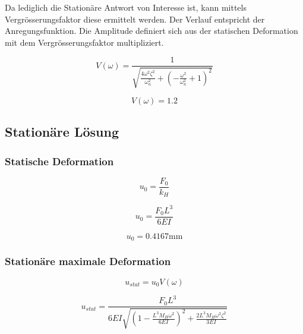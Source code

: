 \documentclass[
  letterpaper,
  DIV=11]{scrreprt}
\begin{document}
Da lediglich die Stationäre Antwort von Interesse ist, kann mittels
Vergrösserungsfaktor diese ermittelt werden. Der Verlauf entspricht der
Anregungsfunktion. Die Amplitude definiert sich aus der statischen
Deformation mit dem Vergrösserungsfaktor multipliziert.

\begin{equation}V{\left(\omega \right)} = \frac{1}{\sqrt{\frac{4 \omega^{2} \zeta_{}^{2}}{\omega_{n}^{2}} + \left(- \frac{\omega^{2}}{\omega_{n}^{2}} + 1\right)^{2}}}\end{equation}

\begin{equation}V{\left(\omega \right)} = 1.2\end{equation}

\hypertarget{stationuxe4re-luxf6sung}{%
\subsection{Stationäre Lösung}\label{stationuxe4re-luxf6sung}}

\hypertarget{statische-deformation-2}{%
\subsubsection{Statische Deformation}\label{statische-deformation-2}}

\begin{equation}u_{0} = \frac{F_{0}}{k_{H}}\end{equation}

\begin{equation}u_{0} = \frac{F_{0} L^{3}}{6 E I}\end{equation}

\begin{equation}u_{0} = 0.4167 \text{mm}\end{equation}

\hypertarget{stationuxe4re-maximale-deformation}{%
\subsubsection{Stationäre maximale
Deformation}\label{stationuxe4re-maximale-deformation}}

\begin{equation}u_{stat} = u_{0} V{\left(\omega \right)}\end{equation}

\begin{equation}u_{stat} = \frac{F_{0} L^{3}}{6 E I \sqrt{\left(1 - \frac{L^{3} M_{H} \omega^{2}}{6 E I}\right)^{2} + \frac{2 L^{3} M_{H} \omega^{2} \zeta^{2}}{3 E I}}}\end{equation}
\end{document}
